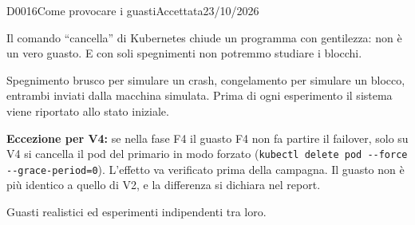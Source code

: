 \begin{decisione}{D0016}{Come provocare i guasti}{Accettata}{23/10/2026}

\contesto
Il comando ``cancella'' di Kubernetes chiude un programma con gentilezza: non è un vero guasto. E con soli spegnimenti non potremmo studiare i blocchi.

\scelta
Spegnimento brusco per simulare un crash, congelamento per simulare un blocco, entrambi inviati dalla macchina simulata. Prima di ogni esperimento il sistema viene riportato allo stato iniziale.

\textbf{Eccezione per V4:} se nella fase F4 il guasto F4 non fa partire il failover, solo su V4 si cancella il pod del primario in modo forzato (\texttt{kubectl delete pod -{}-force -{}-grace-period=0}). L'effetto va verificato prima della campagna. Il guasto non è più identico a quello di V2, e la differenza si dichiara nel report.

\conseguenze
Guasti realistici ed esperimenti indipendenti tra loro.

\end{decisione}
